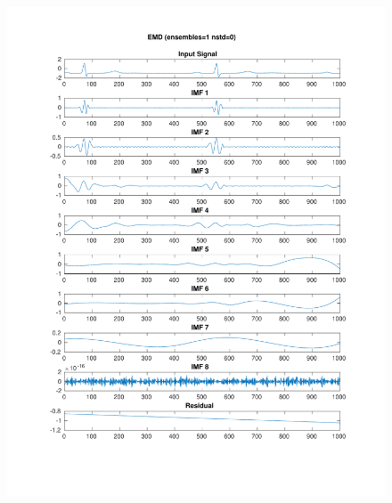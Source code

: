 \documentclass[11pt,a4paper]{article}
\begin{document}
\begin{figure}[H]
\centering
\begin{minipage}{0.48\textwidth}
	\centering
	\includegraphics[width=\textwidth]{fig/123l1_emd.pdf}
	

\end{minipage}
\end{figure}
\end{document}
